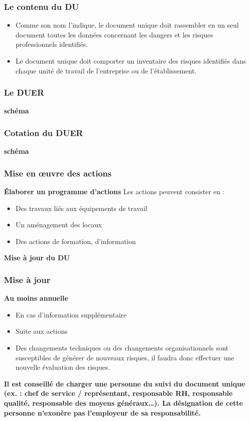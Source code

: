 \documentclass{beamer}
\begin{document}
\begin{frame}
\frametitle{Le contenu du DU}
\begin{itemize}
\item Comme son nom l’indique, le document unique doit rassembler en un seul document toutes les données concernant les dangers et les risques professionnels identifiés.
\item Le document unique doit comporter un inventaire des risques identifiés dans chaque unité de travail de l’entreprise ou de l’établissement.  
\end{itemize}
\end{frame}

\begin{frame}
\frametitle{Le DUER}
\textbf{schéma}
\end{frame}

\begin{frame}
\frametitle{Cotation du DUER}
\textbf{schéma}
\end{frame}

\begin{frame}
\frametitle{Mise en œuvre des actions}
\textbf{Élaborer un programme d’actions }
Les actions peuvent consister en :
\begin{itemize}
\item Des travaux liés aux équipements de travail
\item Un aménagement des locaux
\item Des actions de formation, d’information
\end{itemize}
\textbf{Mise à jour du DU}
\end{frame}

\begin{frame}
\frametitle{Mise à jour}
\textbf{Au moins annuelle}
\begin{itemize}
\item En cas d’information supplémentaire
\item Suite aux actions 
\item Des changements techniques ou des changements organisationnels sont susceptibles de générer de nouveaux risques, il faudra donc effectuer une nouvelle évaluation des risques.
\end{itemize}
\textbf{Il est conseillé de charger une personne du suivi du document unique (ex. : chef de service / représentant, responsable RH, responsable qualité, responsable des moyens généraux…).
La désignation de cette personne n’exonère pas l’employeur de sa responsabilité.}
\end{frame}
\end{document}
